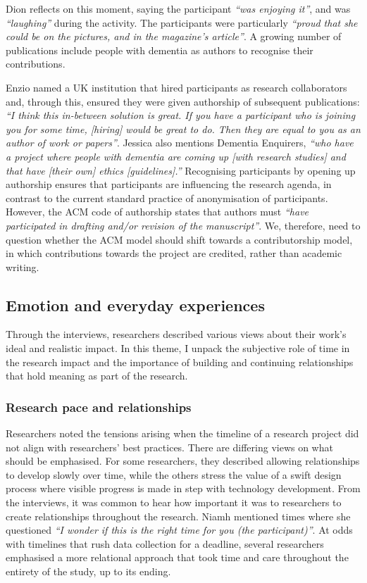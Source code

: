 Dion reflects on this moment, saying the participant \textit{``was enjoying it''}, and was \textit{``laughing''} during the activity. The participants were particularly \textit{``proud that she could be on the pictures, and in the magazine's article''}. A growing number of publications include people with dementia as authors to recognise their contributions. 

Enzio named a UK institution that hired participants as research collaborators and, through this, ensured they were given authorship of subsequent publications: \textit{``I think this in-between solution is great. If you have a participant who is joining you for some time, [hiring] would be great to do. Then they are equal to you as an author of work or papers''}. Jessica also mentions Dementia Enquirers, \textit{``who have a project where people with dementia are coming up [with research studies] and that have [their own] ethics [guidelines].''} Recognising participants by opening up authorship ensures that participants are influencing the research agenda, in contrast to the current standard practice of anonymisation of participants. However, the ACM code of authorship states that authors must \textit{``have participated in drafting and/or revision of the manuscript''}. We, therefore, need to question whether the ACM model should shift towards a contributorship model, in which contributions towards the project are credited, rather than academic writing.

\subsection{Emotion and everyday experiences}
\label{Ethics:ThemePartTwo}
Through the interviews, researchers described various views about their work’s ideal and realistic impact. In this theme, I unpack the subjective role of time in the research impact and the importance of building and continuing relationships that hold meaning as part of the research.

\subsubsection{Research pace and relationships}
\label{Ethics:ThemePartTwo:Time}
Researchers noted the tensions arising when the timeline of a research project did not align with researchers' best practices. There are differing views on what should be emphasised. For some researchers, they described allowing relationships to develop slowly over time, while the others stress the value of a swift design process where visible progress is made in step with technology development. From the interviews, it was common to hear how important it was to researchers to create relationships throughout the research. Niamh mentioned times where she questioned \textit{``I wonder if this is the right time for you (the participant)''}. At odds with timelines that rush data collection for a deadline, several researchers emphasised a more relational approach that took time and care throughout the entirety of the study, up to its ending. 

